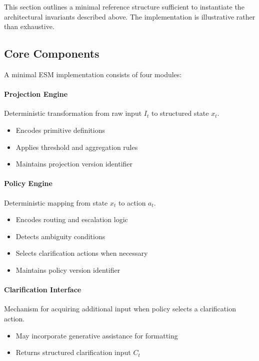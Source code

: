 \documentclass[11pt]{article}
\begin{document}
This section outlines a minimal reference structure sufficient to instantiate the architectural invariants described above. The implementation is illustrative rather than exhaustive.

\subsection{Core Components}

A minimal ESM implementation consists of four modules:

\paragraph{Projection Engine}
Deterministic transformation from raw input $I_t$ to structured state $x_t$.

\begin{itemize}
  \item Encodes primitive definitions
  \item Applies threshold and aggregation rules
  \item Maintains projection version identifier
\end{itemize}

\paragraph{Policy Engine}
Deterministic mapping from state $x_t$ to action $a_t$.

\begin{itemize}
  \item Encodes routing and escalation logic
  \item Detects ambiguity conditions
  \item Selects clarification actions when necessary
  \item Maintains policy version identifier
\end{itemize}

\paragraph{Clarification Interface}
Mechanism for acquiring additional input when policy selects a clarification action.

\begin{itemize}
  \item May incorporate generative assistance for formatting
  \item Returns structured clarification input $C_t$
\end{itemize}
\end{document}
